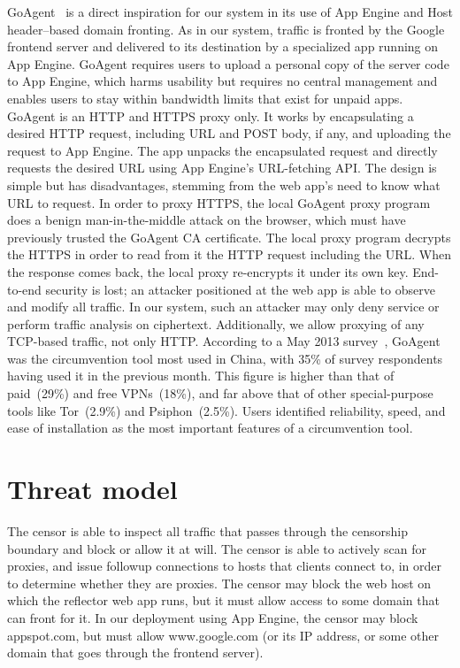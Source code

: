\documentclass[conference]{IEEEtran}
\begin{document}
GoAgent~\cite{goagent} is a direct inspiration for our system in its use of App
Engine and Host header--based domain fronting.
As in our system, traffic is fronted by the Google frontend server
and delivered to its destination by a specialized app running on App Engine.
GoAgent requires users to upload a personal copy of the server code to App Engine,
which harms usability but requires no central management
and enables users to stay within bandwidth limits that exist for unpaid apps.
GoAgent is an HTTP and HTTPS proxy only.
It works by encapsulating a desired HTTP request, including URL and POST body, if any,
and uploading the request to App Engine.
The app unpacks the encapsulated request and directly requests the desired URL using
App Engine's URL-fetching API.
The design is simple but has disadvantages, stemming from the web app's
need to know what URL to request.
In order to proxy HTTPS, the local GoAgent proxy program does a benign man-in-the-middle
attack on the browser, which must have previously trusted the GoAgent CA certificate.
The local proxy program decrypts the HTTPS in order to read from it the HTTP request including the URL.
When the response comes back, the local proxy re-encrypts it under its own key.
End-to-end security is lost; an attacker positioned at the web app
is able to observe and modify all traffic.
In our system, such an attacker may only deny service or perform traffic analysis on ciphertext.
Additionally, we allow proxying of any TCP-based traffic, not only HTTP.
According to a May 2013 survey~\cite{collateral-freedom},
GoAgent was the circumvention tool most used in
China, with 35\% of survey respondents having used it in the previous month.
This figure is higher than that of paid~(29\%) and free VPNs~(18\%), and far
above that of other special-purpose tools like Tor~(2.9\%) and Psiphon~(2.5\%).
Users identified reliability, speed, and ease of installation as the most important features of a circumvention tool.


\section{Threat model}

The censor is able to inspect all traffic that passes through
the censorship boundary and block or allow it at will.
The censor is able to actively scan for proxies, and issue followup
connections to hosts that clients connect to, in order to determine
whether they are proxies.
The censor may block the web host on which the reflector web app runs,
but it must allow access to some domain that can front for it.
In our deployment using App Engine, the censor may block appspot.com,
but must allow www.google.com (or its IP address, or some other domain
that goes through the frontend server).
\end{document}

